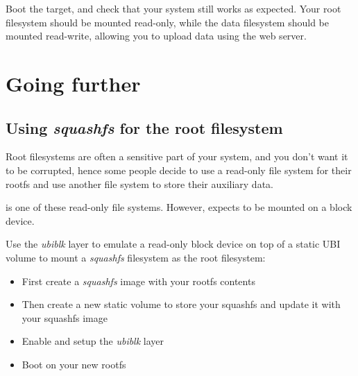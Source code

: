 Boot the target, and check that your system still works as
expected. Your root filesystem should be mounted read-only, while the
data filesystem should be mounted read-write, allowing you to upload
data using the web server.


\section{Going further}

\subsection{Using {\em squashfs} for the root filesystem}

Root filesystems are often a sensitive part of your system, and you don't
want it to be corrupted, hence some people decide to use a read-only
file system for their rootfs and use another file system to store their
auxiliary data.

 is one of these read-only file systems. However,
 expects to be mounted on a block device.

Use the {\em ubiblk} layer to emulate a read-only block device on top
of a static UBI volume to mount a {\em squashfs} filesystem as the
root filesystem:

\begin{itemize}
  \item First create a {\em squashfs} image with your rootfs contents
  \item Then create a new static volume to store your squashfs and update it with
    your squashfs image
  \item Enable and setup the {\em ubiblk} layer
  \item Boot on your new rootfs
\end{itemize}


